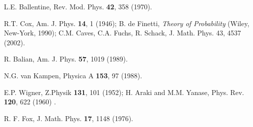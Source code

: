 \begin{multicols}{2}
\begin{thebibliography}{99}
L.E. Ballentine, Rev. Mod. Phys. {\bf 42}, 358 (1970). 


 R.T. Cox, Am. J. Phys. {\bf 14}, 1 (1946);  
B. de Finetti, {\it Theory of Probability} (Wiley, New-York, 1990); 
C.M. Caves, C.A. Fuchs, R. Schack, J. Math. Phys. 43, 4537 (2002).

 R. Balian, Am. J. Phys. {\bf 57},
1019 (1989).

 N.G. van Kampen, Physica A {\bf 153}, 97 (1988).

 E.P. Wigner, Z.Physik {\bf 131}, 101 (1952);
H. Araki and M.M. Yanase, Phys. Rev. {\bf 120}, 622 (1960) . 
   

 R. F. Fox, J. Math. Phys. {\bf 17}, 1148 (1976). 




\end{thebibliography}
\end{multicols}

